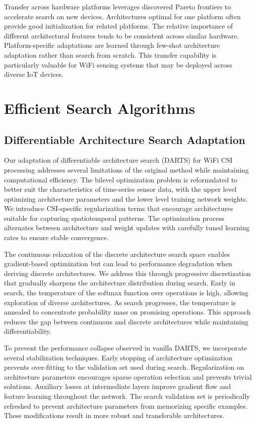 \documentclass[journal]{IEEEtran}
\begin{document}
Transfer across hardware platforms leverages discovered Pareto frontiers to accelerate search on new devices. Architectures optimal for one platform often provide good initialization for related platforms. The relative importance of different architectural features tends to be consistent across similar hardware. Platform-specific adaptations are learned through few-shot architecture adaptation rather than search from scratch. This transfer capability is particularly valuable for WiFi sensing systems that may be deployed across diverse IoT devices.

\section{Efficient Search Algorithms}

\subsection{Differentiable Architecture Search Adaptation}

Our adaptation of differentiable architecture search (DARTS) for WiFi CSI processing addresses several limitations of the original method while maintaining computational efficiency. The bilevel optimization problem is reformulated to better suit the characteristics of time-series sensor data, with the upper level optimizing architecture parameters and the lower level training network weights. We introduce CSI-specific regularization terms that encourage architectures suitable for capturing spatiotemporal patterns. The optimization process alternates between architecture and weight updates with carefully tuned learning rates to ensure stable convergence.

The continuous relaxation of the discrete architecture search space enables gradient-based optimization but can lead to performance degradation when deriving discrete architectures. We address this through progressive discretization that gradually sharpens the architecture distribution during search. Early in search, the temperature of the softmax function over operations is high, allowing exploration of diverse architectures. As search progresses, the temperature is annealed to concentrate probability mass on promising operations. This approach reduces the gap between continuous and discrete architectures while maintaining differentiability.

To prevent the performance collapse observed in vanilla DARTS, we incorporate several stabilization techniques. Early stopping of architecture optimization prevents over-fitting to the validation set used during search. Regularization on architecture parameters encourages sparse operation selection and prevents trivial solutions. Auxiliary losses at intermediate layers improve gradient flow and feature learning throughout the network. The search validation set is periodically refreshed to prevent architecture parameters from memorizing specific examples. These modifications result in more robust and transferable architectures.
\end{document}
